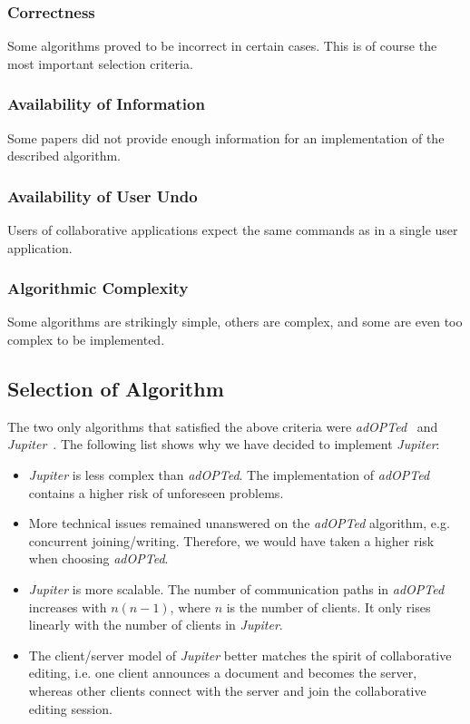 \subsubsection{Correctness} 
Some algorithms proved to be incorrect in certain
cases. This is of course the most important selection criteria.

\subsubsection{Availability of Information} 
Some papers did not provide enough
information for an implementation of the described algorithm.

\subsubsection{Availability of User Undo} 
Users of collaborative applications
expect the same commands as in a single user application. 

\subsubsection{Algorithmic Complexity} 
Some algorithms are strikingly simple,
others are complex, and some are even too complex to be implemented.


\subsection{Selection of Algorithm}
The two only algorithms that satisfied the above criteria were 
\emph{adOPTed}~\cite{ressel96} and \emph{Jupiter}~\cite{jupiter95}. The 
following list shows why we have decided to implement \emph{Jupiter}:

\begin{itemize}
 \item \emph{Jupiter} is less complex than \emph{adOPTed}. The implementation of  \emph{adOPTed} contains a higher risk of unforeseen problems. 
 \item More technical issues remained unanswered on the \emph{adOPTed} 
algorithm, e.g. concurrent joining/writing. Therefore, we would have taken a 
higher risk when choosing \emph{adOPTed}.
 \item \emph{Jupiter} is more scalable. The number of 
communication paths in \emph{adOPTed} increases with $n(n-1)$, where $n$ is the 
number of clients. It only rises linearly with the number of clients in 
\emph{Jupiter}.
 \item The client/server model of \emph{Jupiter} better matches the spirit of collaborative editing, i.e. one client announces a document and becomes the server, whereas other clients connect with the server and join the collaborative editing session.
\end{itemize}

